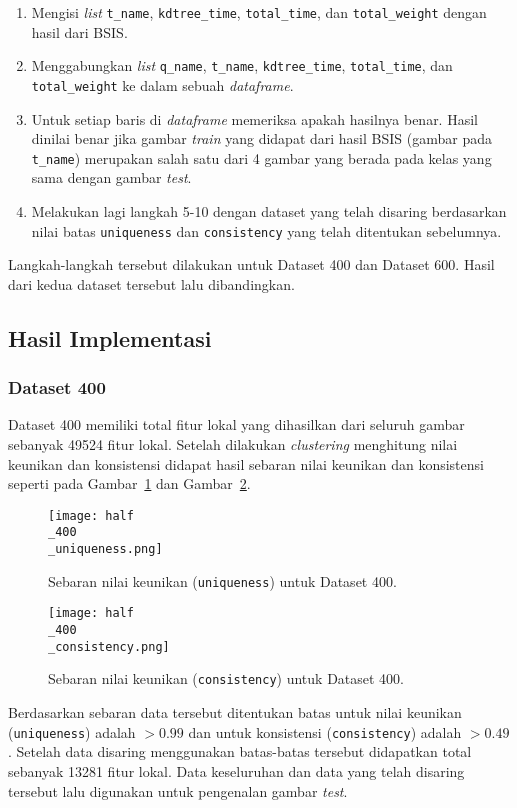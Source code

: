 \begin{enumerate}
	\item Mengisi \textit{list} \texttt{t\_name}, \texttt{kdtree\_time}, \texttt{total\_time}, dan \texttt{total\_weight} dengan hasil dari BSIS.
	\item Menggabungkan \textit{list} \texttt{q\_name}, \texttt{t\_name}, \texttt{kdtree\_time}, \texttt{total\_time}, dan \texttt{total\_weight} ke dalam sebuah \textit{dataframe}.
	\item Untuk setiap baris di \textit{dataframe} memeriksa apakah hasilnya benar. Hasil dinilai benar jika gambar \textit{train} yang didapat dari hasil BSIS (gambar pada \texttt{t\_name}) merupakan salah satu dari 4 gambar yang berada pada kelas yang sama dengan gambar \textit{test}.
	\item Melakukan lagi langkah 5-10 dengan dataset yang telah disaring berdasarkan nilai batas \texttt{uniqueness} dan \texttt{consistency} yang telah ditentukan sebelumnya.
\end{enumerate}
Langkah-langkah tersebut dilakukan untuk Dataset 400 dan Dataset 600. Hasil dari kedua dataset tersebut lalu dibandingkan.

\subsection{Hasil Implementasi}
\subsubsection{Dataset 400}
Dataset 400 memiliki total fitur lokal yang dihasilkan dari seluruh gambar sebanyak 49524 fitur lokal. Setelah dilakukan \textit{clustering} menghitung nilai keunikan dan konsistensi didapat hasil sebaran nilai keunikan dan konsistensi seperti pada Gambar~\ref{fig:half_400_uniqueness} dan Gambar~\ref{fig:half_400_consistency}.
\begin{figure}[H]
	\centering
	\texttt{[image: half\\\_400\\\_uniqueness.png]}
	\caption{Sebaran nilai keunikan (\texttt{uniqueness}) untuk Dataset 400.}
	\label{fig:half_400_uniqueness}
\end{figure}
\begin{figure}[H]
	\centering
	\texttt{[image: half\\\_400\\\_consistency.png]}
	\caption{Sebaran nilai keunikan (\texttt{consistency}) untuk Dataset 400.}
	\label{fig:half_400_consistency}
\end{figure}
Berdasarkan sebaran data tersebut ditentukan batas untuk nilai keunikan (\texttt{uniqueness}) adalah $> 0.99$ dan untuk konsistensi (\texttt{consistency}) adalah $> 0.49$. Setelah data disaring menggunakan batas-batas tersebut didapatkan total sebanyak 13281 fitur lokal. Data keseluruhan dan data yang telah disaring tersebut lalu digunakan untuk pengenalan gambar \textit{test}. 

